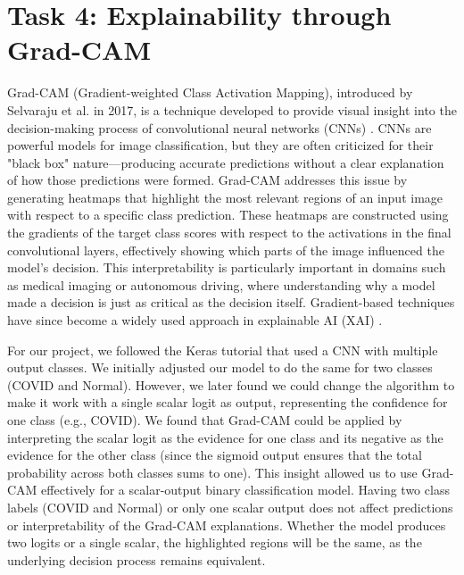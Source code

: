 \documentclass[conference]{IEEEtran}
\begin{document}




\section{Task 4: Explainability through Grad-CAM}\label{sec:task_4}

Grad-CAM (Gradient-weighted Class Activation Mapping), introduced by Selvaraju et al. in 2017, is a technique developed to provide visual insight into the decision-making process of convolutional neural networks (CNNs) \cite{Grad-CAM}. CNNs are powerful models for image classification, but they are often criticized for their "black box" nature—producing accurate predictions without a clear explanation of how those predictions were formed. Grad-CAM addresses this issue by generating heatmaps that highlight the most relevant regions of an input image with respect to a specific class prediction. These heatmaps are constructed using the gradients of the target class scores with respect to the activations in the final convolutional layers, effectively showing which parts of the image influenced the model’s decision.
This interpretability is particularly important in domains such as medical imaging or autonomous driving, where understanding why a model made a decision is just as critical as the decision itself. Gradient-based techniques have since become a widely used approach in explainable AI (XAI) \cite{XAI}. 

For our project, we followed the Keras tutorial \cite{KerasTutorial} that used a CNN with multiple output classes. We initially adjusted our model to do the same for two classes (COVID and Normal). However, we later found we could change the algorithm to make it work with a single scalar logit as output, representing the confidence for one class (e.g., COVID). We found that Grad-CAM could be applied by interpreting the scalar logit as the evidence for one class and its negative as the evidence for the other class (since the sigmoid output ensures that the total probability across both classes sums to one). This insight allowed us to use Grad-CAM effectively for a scalar-output binary classification model. Having two class labels (COVID and Normal) or only one scalar output does not affect predictions or interpretability of the Grad-CAM explanations. Whether the model produces two logits or a single scalar, the highlighted regions will be the same, as the underlying decision process remains equivalent.
\end{document}
